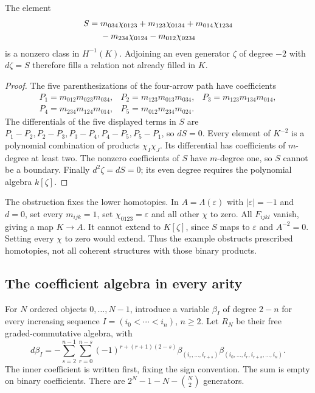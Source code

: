 \begin{proposition}
\label{prop:vol2-directed-pentagon}
The element
\begin{align}\label{eq:vol2-directed-pentagon}
 S={}&m_{034}\chi_{0123}+m_{123}\chi_{0134}
           +m_{014}\chi_{1234}\notag\\
    &-m_{234}\chi_{0124}-m_{012}\chi_{0234}
\end{align}
is a nonzero class in $H^{-1}(K)$. Adjoining an even generator
$\zeta$ of degree $-2$ with $d\zeta=S$ therefore fills a
relation not already filled in $K$.
\end{proposition}

\begin{proof}
The five parenthesizations of the four-arrow path have
coefficients
\[
 \begin{array}{lll}
 P_1=m_{012}m_{023}m_{034},&P_2=m_{123}m_{013}m_{034},&
 P_3=m_{123}m_{134}m_{014},\\
 P_4=m_{234}m_{124}m_{014},&P_5=m_{012}m_{234}m_{024}.&
 \end{array}
\]
The differentials of the five displayed terms in $S$ are
$P_1-P_2,P_2-P_3,P_3-P_4,P_4-P_5,P_5-P_1$, so $dS=0$.
Every element of $K^{-2}$ is a polynomial combination of
products $\chi_I\chi_J$. Its differential has coefficients
of $m$-degree at least two. The nonzero coefficients of $S$
have $m$-degree one, so $S$ cannot be a boundary.
Finally $d^2\zeta=dS=0$; its even degree requires the
polynomial algebra $k[\zeta]$.
\end{proof}

The obstruction fixes the lower homotopies. In
$A=\Lambda(\varepsilon)$ with $|\varepsilon|=-1$ and $d=0$,
set every $m_{ijk}=1$, set $\chi_{0123}=\varepsilon$ and
all other $\chi$ to zero. All $F_{ijkl}$ vanish, giving a
map $K\to A$. It cannot extend to $K[\zeta]$, since $S$
maps to $\varepsilon$ and $A^{-2}=0$. Setting every $\chi$
to zero would extend. Thus the example obstructs prescribed
homotopies, not all coherent structures with those binary
products.

\subsection{The coefficient algebra in every arity}

For $N$ ordered objects $0,\ldots,N-1$, introduce a variable
$\beta_I$ of degree $2-n$ for every increasing sequence
$I=(i_0<\cdots<i_n)$, $n\geq2$. Let $R_N$ be their free
graded-commutative algebra, with
\begin{equation}\label{eq:vol2-directed-all-arity}
 d\beta_I=-\sum_{s=2}^{n-1}\sum_{r=0}^{n-s}
 (-1)^{r+(r+1)(2-s)}
 \beta_{(i_r,\ldots,i_{r+s})}
 \beta_{(i_0,\ldots,i_r,i_{r+s},\ldots,i_n)}.
\end{equation}
The inner coefficient is written first, fixing the sign
convention. The sum is empty on binary coefficients.
There are $2^N-1-N-\binom N2$ generators.

